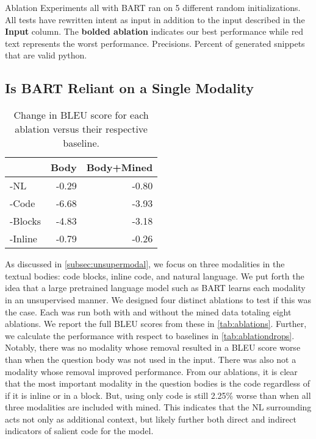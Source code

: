 \documentclass[11pt]{article}
\newcommand{\incorrettext}[1]{\textcolor{IncorrectText}{#1}}
\begin{document}
\begin{table*}[h]
    \caption{Ablation Experiments all with BART ran on 5 different random initializations. All tests have rewritten intent as input in addition to the input described in the \textbf{Input} column. The \textbf{bolded ablation} indicates our best performance while \incorrettext{red text} represents the worst performance. Precisions. Percent of generated snippets that are valid python.}
    
    \label{tab:ablations}
\end{table*}
\subsection{Is BART Reliant on a Single Modality} \label{subsec:bartreliant}
\begin{table}[]
    \centering
    \begin{tabular}{l|rr}\toprule
         &  Body& Body+Mined \\
         \hline
         -NL & -0.29&  -0.80\\
         -Code &  -6.68&-3.93 \\
         -Blocks&  -4.83 &-3.18\\
         -Inline & -0.79&-0.26\\
         \bottomrule
    \end{tabular}
    \caption{Change in BLEU score for each ablation versus their respective baseline.}
    \label{tab:ablationdrops}
\end{table}
As discussed in \autoref{subsec:unsupermodal}, we focus on three modalities in the textual bodies: code blocks, inline code, and natural language. We put forth the idea that a large pretrained language model such as BART learns each modality in an unsupervised manner. We designed four distinct ablations to test if this was the case. Each was run both with and without the mined data totaling eight ablations. We report the full BLEU scores from these in \autoref{tab:ablations}. Further, we calculate the performance with respect to baselines in \autoref{tab:ablationdrops}. Notably, there was no modality whose removal resulted in a BLEU score worse than when the question body was not used in the input. There was also not a modality whose removal improved performance. From our ablations, it is clear that the most important modality in the question bodies is the code regardless of if it is inline or in a block. But, using only code is still 2.25\% worse than when all three modalities are included with mined. This indicates that the NL surrounding acts not only as additional context, but likely further both direct and indirect indicators of salient code for the model.
\end{document}

